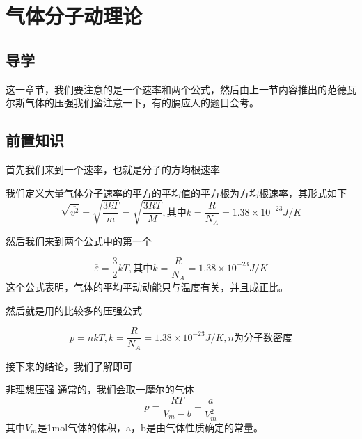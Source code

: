 \documentclass[lang=cn,10pt]{elegantbook}
\begin{document}
	\chapter{气体分子动理论}
	\section{导学}
		这一章节，我们要注意的是一个速率和两个公式，然后由上一节内容推出的范德瓦尔斯气体的压强我们蛮注意一下，有的膈应人的题目会考。
	\section{前置知识}
	
	首先我们来到一个速率，也就是分子的方均根速率
	
	\begin{definition}[方均根速率]
		我们定义大量气体分子速率的平方的平均值的平方根为方均根速率，其形式如下
		\begin{equation*}
			\sqrt{\overline{v^2}}=\sqrt{\frac{3kT}{m}}=\sqrt{\frac{3RT}{M}},\text{其中}k=\frac{R}{N_{A}}=1.38\times10^{-23}J/K
		\end{equation*}
	\end{definition}
	
	然后我们来到两个公式中的第一个
	\begin{theorem}[平均平动动能公式]
		\begin{equation*}
			\overline{\varepsilon }=\frac{3}{2}kT,\text{其中}k=\frac{R}{N_{A}}=1.38\times10^{-23}J/K
		\end{equation*}
		这个公式表明，气体的平均平动动能只与温度有关，并且成正比。
	\end{theorem}
	
	然后就是用的比较多的压强公式
	\begin{theorem}[压强公式]
		\begin{equation*}
			p=nkT,k=\frac{R}{N_{A}}=1.38\times10^{-23}J/K,n\text{为分子数密度}
		\end{equation*}
	\end{theorem}
	接下来的结论，我们了解即可
	\begin{theorem}[范德瓦尔斯气体压强]{非理想压强}
		通常的，我们会取一摩尔的气体
		\begin{equation*}
			p=\frac{RT}{V_m-b}-\frac{a}{V_{m}^{2}}
		\end{equation*}
		其中$V_{m}$是1mol气体的体积，a，b是由气体性质确定的常量。
	\end{theorem}
	
\end{document}
